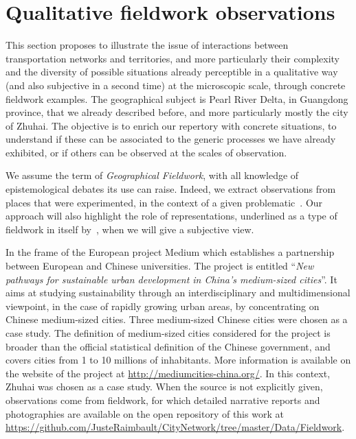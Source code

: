 \section{Qualitative fieldwork observations}


This section proposes to illustrate the issue of interactions between transportation networks and territories, and more particularly their complexity and the diversity of possible situations already perceptible in a qualitative way (and also subjective in a second time) at the microscopic scale, through concrete fieldwork examples. The geographical subject is Pearl River Delta, in Guangdong province, that we already described before, and more particularly mostly the city of Zhuhai. The objective is to enrich our repertory with concrete situations, to understand if these can be associated to the generic processes we have already exhibited, or if others can be observed at the scales of observation.


We assume the term of \emph{Geographical Fieldwork}, with all knowledge of epistemological debates its use can raise. Indeed, we extract observations from places that were experimented, in the context of a given problematic~\cite{retaille2010terrain}. Our approach will also highlight the role of representations, underlined as a type of fieldwork in itself by~\cite{lefort2012terrain}, when we will give a subjective view.

In the frame of the European project Medium which establishes a partnership between European and Chinese universities. The project is entitled ``\textit{New pathways for sustainable urban development in China’s medium-sized cities}''. It aims at studying sustainability through an interdisciplinary and multidimensional viewpoint, in the case of rapidly growing urban areas, by concentrating on Chinese medium-sized cities. Three medium-sized Chinese cities were chosen as a case study. The definition of medium-sized cities considered for the project is broader than the official statistical definition of the Chinese government, and covers cities from 1 to 10 millions of inhabitants. More information is available on the website of the project at \url{http://mediumcities-china.org/}. In this context, Zhuhai was chosen as a case study. When the source is not explicitly given, observations come from fieldwork, for which detailed narrative reports and photographies are available on the open repository of this work at \url{https://github.com/JusteRaimbault/CityNetwork/tree/master/Data/Fieldwork}.

